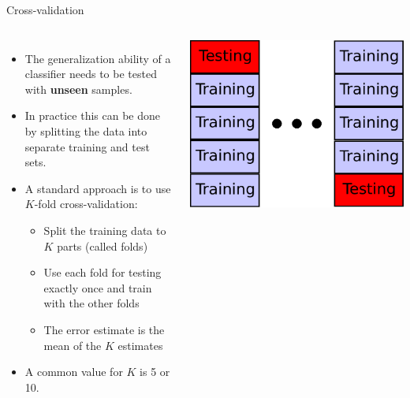 \documentclass[10pt, aspectratio=169]{beamer} %
\begin{document}
\begin{frame}[fragile]{Cross-validation}
\begin{columns}
\begin{itemize}
\item The generalization ability of a classifier needs to be tested with
\textbf{unseen} samples.
\item In practice this can be done by splitting the data into separate training 
and test sets.
\item A standard approach is to use $K$-fold cross-validation:
\begin{itemize}
\item Split the training data to $K$ parts (called folds)
\item Use each fold for testing exactly once and train with the other folds
\item The error estimate is the mean of the $K$ estimates
\end{itemize}
\item A common value for $K$ is 5 or 10.
\end{itemize}
\centerline{\includegraphics[width=0.8\columnwidth]{CV-Split.pdf}}
\end{columns}
\end{frame}
\end{document}
